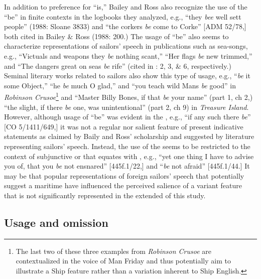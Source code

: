   In addition to preference for “is,” Bailey and Ross also recognize the use of the   “be” in finite contexts in the logbooks they analyzed, e.g., “they \textit{bee} well sett people” (1988: Sloane 3833) and “the corkers \textit{be} come to Corke” [ADM 52/78,] both cited in Bailey \& Ross (1988: 200.) The usage of  “be” also seems to characterize representations of sailors’ speech in publications such as sea-songs, e.g., “Victuals and weapons they \textit{be} nothing scant,” “Her flags \textit{be} new trimmed,” and “The dangers great on seas \textit{be} rife” (cited in \citealt{Palmer1986}: 2, 3, \& 6, respectively.) Seminal literary works related to sailors also show this type of usage, e.g., “\textit{be} it some Object,” “he \textit{be} much O glad,” and “you teach wild Mans \textit{be} good” in  \textit{Robinson Crusoe}\footnote{The last two of these three examples from \textit{Robinson Crusoe} are contextualized in the voice of Man Friday and thus potentially aim to illustrate a Ship  feature rather than a variation inherent to Ship English.}  and “Master Billy Bones, if that \textit{be} your name” (part 1, ch 2,) “the slight, if there \textit{be} one, was unintentional” (part 2, ch 9) in  \textit{Treasure Island}. However, although usage of  “be” was evident in the , e.g., “if any such there \textit{be}” [CO 5/1411/649,] it was not a regular nor salient feature of present indicative statements as claimed by Baily and Ross’ scholarship and suggested by literature representing sailors’ speech. Instead, the use of the   seems to be restricted to the context of subjunctive or  that equates with , e.g., “yet one thing I have to advise you of, that you \textit{be} not ensnared” [445f.1/22,] and “\textit{be} not afraid” [445f.1/44.] It may be that popular representations of foreign sailors’ speech that potentially suggest a maritime  have influenced the perceived salience of a variant   feature that is not significantly represented in the extended  of this study. 

\subsection{{Usage} {and} {omission}  }%

